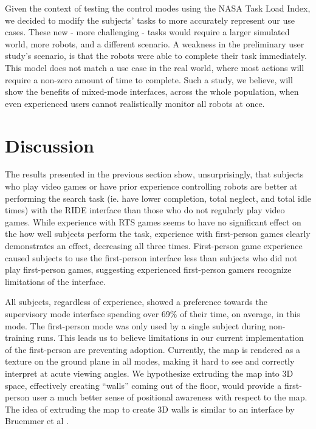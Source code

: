 Given the context of testing the control modes using the NASA Task Load Index, we decided to modify the subjects' tasks to more accurately represent our use cases. These new - more challenging - tasks would require a larger simulated world, more robots, and a different scenario. A weakness in the preliminary user study's scenario, is that the robots were able to complete their task immediately. This model does not match a use case in the real world, where most actions will require a non-zero amount of time to complete. Such a study, we believe, will show the benefits of mixed-mode interfaces, across the whole population, when even experienced users cannot realistically monitor all robots at once.

\section{Discussion} %
\label{sec:discussion}

The results presented in the previous section show, unsurprisingly, that subjects who play video games or have prior experience controlling robots are better at performing the search task (ie. have lower completion, total neglect, and total idle times) with the RIDE interface than those who do not regularly play video games. While experience with RTS games seems to have no significant effect on the how well subjects perform the task, experience with first-person games clearly demonstrates an effect, decreasing all three times. First-person game experience caused subjects to use the first-person interface less than subjects who did not play first-person games, suggesting experienced first-person gamers recognize limitations of the interface.

All subjects, regardless of experience, showed a preference towards the supervisory mode interface spending over 69\% of their time, on average, in this mode. The first-person mode was only used by a single subject during non-training runs. This leads us to believe limitations in our current implementation of the first-person are preventing adoption. Currently, the map is rendered as a texture on the ground plane in all modes, making it hard to see and correctly interpret at acute viewing angles. We hypothesize extruding the map into 3D space, effectively creating ``walls'' coming out of the floor, would provide a first-person user a much better sense of positional awareness with respect to the map. The idea of extruding the map to create 3D walls is similar to an interface by Bruemmer et al \cite{Bruemmer05turnoff}.

